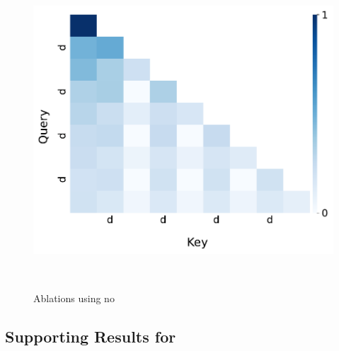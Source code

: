 \begin{figure}[t]
\begin{minipage}{0.33\textwidth}
  \end{minipage}~
  \begin{minipage}{0.33\textwidth}
      \centering
      \label{fig:appendix-ablation-delim-attn}
      \vspace{-.2em}
      \includegraphics[width=\linewidth]{Figures/figures_circuit/interventions/delim_no_rope/L0_no_rope_attn_weights.pdf}
  \end{minipage}~
  
  \caption{\small Ablations using no \rope
  }
  \label{figure:appendix-ablation-delim}
\end{figure}


\subsection{Supporting Results for } \label{sub:app_supporting_lots_of_heads}


